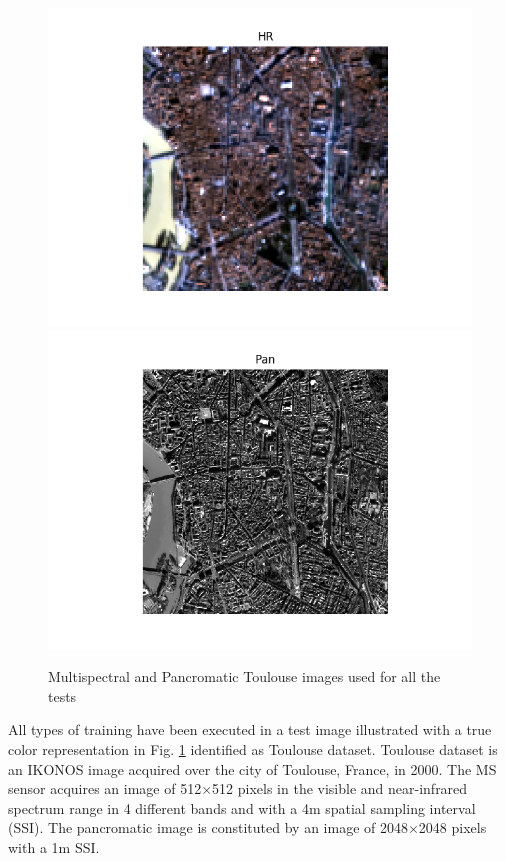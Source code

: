 \documentclass[12pt]{report}
\begin{document}
\begin{figure}[t]
    \centering
    \includegraphics[scale=.5]{toulouse.png}
    \includegraphics[scale=.5]{toulouse_pan.png}
    \caption{Multispectral and Pancromatic Toulouse images used for all the tests}
    \label{fig:toulouse}
\end{figure}


All types of training have been executed in a test image illustrated with a true color representation in Fig. \ref{fig:toulouse} identified as Toulouse dataset.
Toulouse dataset is an IKONOS image acquired over the city of Toulouse, France, in 2000.
The MS sensor acquires an image of 512$\times$512 pixels in the visible and near-infrared spectrum range in 4
different bands and with a 4m spatial sampling interval (SSI). 
The pancromatic image is constituted by an image of 2048$\times$2048 pixels with a 1m SSI.
\end{document}
